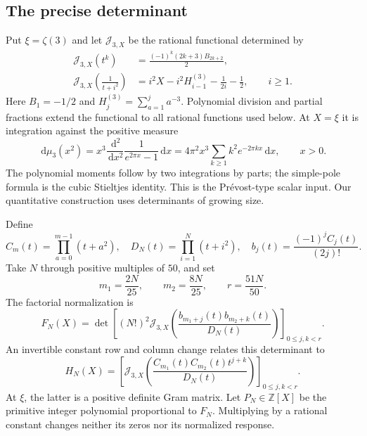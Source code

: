 \documentclass[11pt]{article}
\theoremstyle{definition}\newtheorem{definition}[theorem]{Definition}
\theoremstyle{remark}\newtheorem{remark}[theorem]{Remark}
\newcommand{\dd}{\,\mathrm d}
\begin{document}
\subsection{The precise determinant}
Put $\xi=\zeta(3)$ and let $\mathcal J_{3,X}$ be the rational functional determined by
\begin{align}
 \mathcal J_{3,X}(t^k)&=\frac{(-1)^k(2k+3)B_{2k+2}}2,\label{eq:moments}\\
 \mathcal J_{3,X}\!\left(\frac1{t+i^2}\right)
 &=i^2X-i^2H_{i-1}^{(3)}-\frac1{2i}-\frac12,
 \qquad i\ge1.\label{eq:poles}
\end{align}
Here $B_1=-1/2$ and $H_j^{(3)}=\sum_{a=1}^j a^{-3}$. Polynomial division and partial fractions extend the functional to all rational functions used below. At $X=\xi$ it is integration against the positive measure
\[
 \dd\mu_3(x^2)=x^3\frac{\dd^2}{\dd x^2}
                  \frac1{e^{2\pi x}-1}\dd x
 =4\pi^2x^3\sum_{k\ge1}k^2e^{-2\pi kx}\dd x,
 \qquad x>0.
\]
The polynomial moments follow by two integrations by parts; the simple-pole formula is the cubic Stieltjes identity. This is the Pr\'evost-type scalar input. Our quantitative construction uses determinants of growing size.

Define
\[
 C_m(t)=\prod_{a=0}^{m-1}(t+a^2),\quad
 D_N(t)=\prod_{i=1}^N(t+i^2),\quad
 b_j(t)=\frac{(-1)^j C_j(t)}{(2j)!}.
\]
Take $N$ through positive multiples of $50$, and set
\[
 m_1=\frac{2N}{25},\qquad m_2=\frac{8N}{25},\qquad r=\frac{51N}{50}.
\]
The factorial normalization is
\begin{equation}\label{eq:FN}
 F_N(X)=\det\left[(N!)^2\mathcal J_{3,X}
 \left(\frac{b_{m_1+j}(t)b_{m_2+k}(t)}{D_N(t)}\right)
 \right]_{0\le j,k<r}.
\end{equation}
An invertible constant row and column change relates this determinant to
\begin{equation}\label{eq:Hmain}
 H_N(X)=\left[\mathcal J_{3,X}
 \left(\frac{C_{m_1}(t)C_{m_2}(t)t^{j+k}}{D_N(t)}\right)
 \right]_{0\le j,k<r}.
\end{equation}
At $\xi$, the latter is a positive definite Gram matrix. Let $P_N\in\mathbb Z[X]$ be the primitive integer polynomial proportional to $F_N$. Multiplying by a rational constant changes neither its zeros nor its normalized response.
\end{document}
